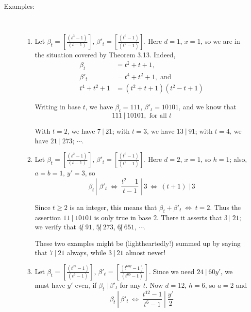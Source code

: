 \begin{description}
  \item[Examples:] $\ $
    \begin{enumerate}[\hspace{1cm}(1)]
      \item Let $\beta_{t} = \left[ \frac{(t^{3}-1)}{(t-1)} \right]$, $\beta'_{t} = \left[ \frac{(t^{6}-1)}{(t^{2}-1)} \right]$. Here $d = 1$, $x = 1$, so we are in the situation covered by Theorem 3.13. Indeed,
        \begin{align*}
        \beta_{t} & = t^{2} + t + 1, \\
        \beta'_{t} & = t^{4} + t^{2} + 1, \text{ and } \\
        t^{4} + t^{2} + 1 & = (t^{2} + t + 1) (t^{2} - t + 1)
        \end{align*}

        Writing in base $t$, we have $\beta_{t} = 111$, $\beta'_{t} = 10101$, and we know that
        \begin{equation*}
        111\ |\ 10101, \text{ for all } t
        \end{equation*}

        With $t = 2$, we have $7\ |\ 21$; with $t = 3$, we have $13\ |\ 91$; with $t = 4$, we have $21\ |\ 273$; $\cdots$.

      \item Let $\beta_{t} = \left[ \frac{(t^{2}-1)}{(t-1)} \right]$, $\beta'_{t} = \left[ \frac{(t^{6}-1)}{(t^{2}-1)} \right]$. Here $d = 2$, $x = 1$, so $h = 1$; also, $a = b = 1$, $y' = 3$, so
        \begin{equation*}
        \beta_{t}\ \left|\ \beta'_{t}\ \Longleftrightarrow\ \frac{t^{2}-1}{t-1}\ \right|\ 3\ \Longleftrightarrow\ (t+1)\ |\ 3
        \end{equation*}

        Since $t \geq 2$ is an integer, this means that $\beta_{t} + \beta'_{t}\ \Longleftrightarrow\ t = 2$. Thus the assertion $11\ |\ 10101$ is only true in base $2$. There it asserts that $3\ |\ 21$; we verify that $4 \not|\ 91$, $5 \not|\ 273$, $6 \not|\ 651$, $\cdots$.

        These two examples might be (lightheartedly!) summed up by saying that $7\ |\ 21$ always, while $3\ |\ 21$ almost never!

      \item Let $\beta_{t} = \left[ \frac{(t^{24}-1)}{(t^{6}-1)} \right]$, $\beta'_{t} = \left[ \frac{(t^{60y}-1)}{(t^{60}-1)} \right]$. Since we need $24\ |\ 60y'$, we must have $y'$ even, if $\beta_{t}\ |\ \beta'_{t}$ for any $t$. Now $d = 12$, $h = 6$, so $a = 2$ and
        \begin{equation*}
        \beta_{t}\ \left|\ \beta'_{t}\ \Longleftrightarrow\ \frac{t^{12}-1}{t^{6}-1}\ \right|\ \frac{y'}{2}
        \end{equation*}


\end{enumerate}
\end{description}
